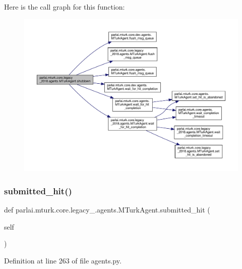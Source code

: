 Here is the call graph for this function\+:
\nopagebreak
\begin{figure}[H]
\begin{center}
\leavevmode
\includegraphics[width=350pt]{classparlai_1_1mturk_1_1core_1_1legacy__2018_1_1agents_1_1MTurkAgent_a13d1446c41c7342e3d23719cf190d304_cgraph}
\end{center}
\end{figure}
\mbox{\label{classparlai_1_1mturk_1_1core_1_1legacy__2018_1_1agents_1_1MTurkAgent_a8f1e6f940081eab5ce329b106c61b294}} 
\subsubsection{\texorpdfstring{submitted\+\_\+hit()}{submitted\_hit()}}
{\footnotesize\ttfamily def parlai.\+mturk.\+core.\+legacy\+\_.\+agents.\+M\+Turk\+Agent.\+submitted\+\_\+hit (\begin{DoxyParamCaption}\item[{}]{self }\end{DoxyParamCaption})}



Definition at line 263 of file agents.\+py.



